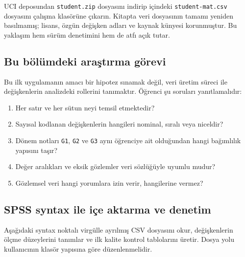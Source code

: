 \begin{softwarebox}
UCI deposundan \texttt{student.zip} dosyasını indirip içindeki
\texttt{student-mat.csv} dosyasını çalışma klasörüne çıkarın. Kitapta veri
dosyasının tamamı yeniden basılmamış; lisans, özgün değişken adları ve kaynak
künyesi korunmuştur. Bu yaklaşım hem sürüm denetimini hem de atfı açık tutar.
\end{softwarebox}

\subsection{Bu bölümdeki araştırma görevi}

Bu ilk uygulamanın amacı bir hipotez sınamak değil, veri üretim süreci ile
değişkenlerin analizdeki rollerini tanımaktır. Öğrenci şu soruları
yanıtlamalıdır:

\begin{enumerate}
  \item Her satır ve her sütun neyi temsil etmektedir?
  \item Sayısal kodlanan değişkenlerin hangileri nominal, sıralı veya niceldir?
  \item Dönem notları \texttt{G1}, \texttt{G2} ve \texttt{G3} aynı öğrenciye ait olduğundan hangi bağımlılık yapısını taşır?
  \item Değer aralıkları ve eksik gözlemler veri sözlüğüyle uyumlu mudur?
  \item Gözlemsel veri hangi yorumlara izin verir, hangilerine vermez?
\end{enumerate}

\subsection{SPSS syntax ile içe aktarma ve denetim}

Aşağıdaki syntax noktalı virgülle ayrılmış CSV dosyasını okur, değişkenlerin
ölçme düzeylerini tanımlar ve ilk kalite kontrol tablolarını üretir. Dosya yolu
kullanıcının klasör yapısına göre düzenlenmelidir.

